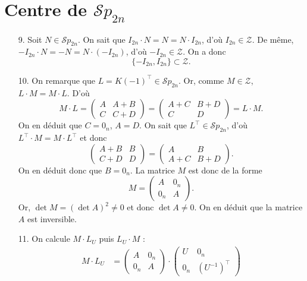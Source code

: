 \documentclass[a4paper]{article}
\begin{document}
	\section*{Centre de $\mathcal{S}p_{2n}$}
	\begin{enumerate}
		\item[9.] Soit $N \in \mathcal{S}p_{2n}$. On sait que $I_{2n}\cdot N = N = N\cdot I_{2n}$, d'où $I_{2n} \in \mathcal{Z}$.
			De même, $-I_{2n} \cdot N = -N = N \cdot (-I_{2n})$, d'où $-I_{2n} \in \mathcal{Z}$. On a donc \[
				\boxed{\{-I_{2n}, I_{2n}\} \subset \mathcal{Z}.}
			\]
		\item[10.] On remarque que $L = K(-1)^\top \in \mathcal{S}p_{2n}$. Or, comme $M \in \mathcal{Z}$, $L\cdot M = M \cdot L$. D'où \[
				M\cdot L = \begin{pmatrix}
					A&A+B\\
					C&C+D
				\end{pmatrix} = \begin{pmatrix}
					A+C&B+D\\
					C&D
				\end{pmatrix} = L \cdot M
			.\] On en déduit que $C = 0_n$, $A = D$.
			On sait que $L^\top \in \mathcal{S}p_{2n}$, d'où $L^\top \cdot M = M\cdot L^\top$\/ et donc \[
				\begin{pmatrix}
					A + B & B\\
					C + D & D
				\end{pmatrix} = \begin{pmatrix}
					A & B\\
					A + C & B + D
				\end{pmatrix}
			.\] On en déduit donc que $B = 0_n$. La matrice $M$\/ est donc de la forme \[
				M = \begin{pmatrix}
					A&0_n\\
					0_n&A
				\end{pmatrix}
			.\] Or, $\det M = (\det A)^2 \neq 0$\/ et donc $\det A \neq 0$. On en déduit que la matrice $A$\/ est inversible.
		\item[11.] On calcule $M \cdot L_U$\/ puis $L_U\cdot M$\/ :
			\begin{align*}
				M \cdot L_U &= \begin{pmatrix}
					A&0_n\\
					0_n&A
				\end{pmatrix} \cdot \begin{pmatrix}
					U&0_n\\
					0_n&(U^{-1})^\top
				\end{pmatrix} \\

\end{align*}
\end{enumerate}
\end{document}
